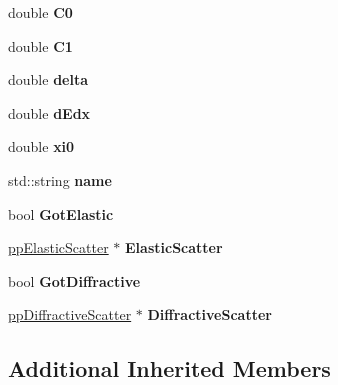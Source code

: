 \begin{DoxyCompactItemize}
double {\bfseries C0}
\item 
\mbox{\label{classParticleTracking_1_1ProtonBunch_a643e1779cc47d198cd578eb52d74ccf7}} 
double {\bfseries C1}
\item 
\mbox{\label{classParticleTracking_1_1ProtonBunch_aa879096a4788745354ceba97452090cf}} 
double {\bfseries delta}
\item 
\mbox{\label{classParticleTracking_1_1ProtonBunch_a1c4abf9f57d57dce1eb6b1ead3377a8a}} 
double {\bfseries d\+Edx}
\item 
\mbox{\label{classParticleTracking_1_1ProtonBunch_a4ee537987418390989d9bc4d1b55aaa6}} 
double {\bfseries xi0}
\item 
\mbox{\label{classParticleTracking_1_1ProtonBunch_a27ca346304e73d21a558d7dddfd6a1aa}} 
std\+::string {\bfseries name}
\item 
\mbox{\label{classParticleTracking_1_1ProtonBunch_a25257cb99a5d2a2cb6637857887ad129}} 
bool {\bfseries Got\+Elastic}
\item 
\mbox{\label{classParticleTracking_1_1ProtonBunch_a39ff88ae1998a0b07f8f5b54def3945f}} 
\hyperlink{classParticleTracking_1_1ppElasticScatter}{pp\+Elastic\+Scatter} $\ast$ {\bfseries Elastic\+Scatter}
\item 
\mbox{\label{classParticleTracking_1_1ProtonBunch_abc74a49a77ee685376e652bcab2e1051}} 
bool {\bfseries Got\+Diffractive}
\item 
\mbox{\label{classParticleTracking_1_1ProtonBunch_a1a1597dc4c74168ed5b7d652e5286c46}} 
\hyperlink{classParticleTracking_1_1ppDiffractiveScatter}{pp\+Diffractive\+Scatter} $\ast$ {\bfseries Diffractive\+Scatter}
\end{DoxyCompactItemize}
\subsection*{Additional Inherited Members}


